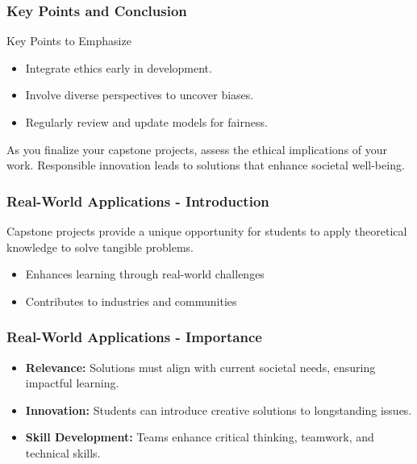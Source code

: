 \documentclass[aspectratio=169]{beamer}
\begin{document}
\begin{frame}[fragile]
    \frametitle{Key Points and Conclusion}
    \begin{block}{Key Points to Emphasize}
        \begin{itemize}
            \item Integrate ethics early in development.
            \item Involve diverse perspectives to uncover biases.
            \item Regularly review and update models for fairness.
        \end{itemize}
    \end{block}
    
    As you finalize your capstone projects, assess the ethical implications of your work. Responsible innovation leads to solutions that enhance societal well-being.
\end{frame}

\begin{frame}[fragile]
    \frametitle{Real-World Applications - Introduction}
    Capstone projects provide a unique opportunity for students to apply theoretical knowledge to solve tangible problems. 
    \begin{itemize}
        \item Enhances learning through real-world challenges
        \item Contributes to industries and communities
    \end{itemize}
\end{frame}

\begin{frame}[fragile]
    \frametitle{Real-World Applications - Importance}
    \begin{itemize}
        \item \textbf{Relevance:} Solutions must align with current societal needs, ensuring impactful learning.
        \item \textbf{Innovation:} Students can introduce creative solutions to longstanding issues.
        \item \textbf{Skill Development:} Teams enhance critical thinking, teamwork, and technical skills.
    \end{itemize}
\end{frame}
\end{document}
